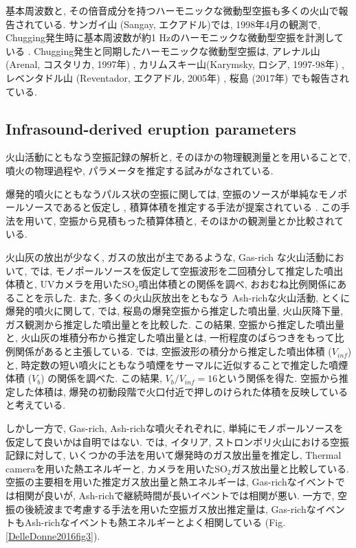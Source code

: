 \documentclass[12pt]{article}
\begin{document}
基本周波数と, その倍音成分を持つハーモニックな微動型空振も多くの火山で報告されている. サンガイ山 (Sangay, エクアドル)では, 1998年4月の観測で, Chugging発生時に基本周波数が約1 Hzのハーモニックな微動型空振を計測している \citep{Johnson2000}. Chugging発生と同期したハーモニックな微動型空振は, アレナル山 (Arenal, コスタリカ, 1997年) \citep{Hagerty2000}, カリムスキー山(Karymsky, ロシア, 1997-98年) \citep{Johnson2000}, レベンタドル山 (Reventador, エクアドル, 2005年) \citep{Lees2008}, 桜島 (2017年) \citep{sakai1996, iguchi2018} でも報告されている.


\clearpage
\subsection{Infrasound-derived eruption parameters}\label{AcointPara}

火山活動にともなう空振記録の解析と, そのほかの物理観測量とを用いることで, 噴火の物理過程や, パラメータを推定する試みがなされている. 

爆発的噴火にともなうパルス状の空振に関しては, 空振のソースが単純なモノポールソースであると仮定し \citep{Lighthill1978}, 積算体積を推定する手法が提案されている \citep{Johnson2003}. この手法を用いて, 空振から見積もった積算体積と, そのほかの観測量とか比較されている.

火山灰の放出が少なく, ガスの放出が主であるような, Gas-rich な火山活動において, \cite{Dalton2010}では, モノポールソースを仮定して空振波形を二回積分して推定した噴出体積と, UVカメラを用いたSO$_2$噴出体積との関係を調べ, おおむね比例関係にあることを示した.
また, 多くの火山灰放出をともなう Ash-richな火山活動, とくに爆発的噴火に関して, \cite{Fee2017a}では, 桜島の爆発空振から推定した噴出量, 火山灰降下量, ガス観測から推定した噴出量とを比較した. この結果, 空振から推定した噴出量と, 火山灰の堆積分布から推定した噴出量とは, 一桁程度のばらつきをもって比例関係があると主張している.
\cite{Yamada2018b}では, 空振波形の積分から推定した噴出体積 ($V_{inf}$)と, 時定数の短い噴火にともなう噴煙をサーマルに近似することで推定した噴煙体積 ($V_{b}$) の関係を調べた. この結果, $V_{b}/V_{inf}=16$という関係を得た. 空振から推定した体積は, 爆発の初動段階で火口付近で押しのけられた体積を反映していると考えている. 

しかし一方で, Gas-rich, Ash-richな噴火それぞれに, 単純にモノポールソースを仮定して良いかは自明ではない. \cite{DelleDonne2016} では, イタリア, ストロンボリ火山における空振記録に対して, いくつかの手法を用いて爆発時のガス放出量を推定し, Thermal cameraを用いた熱エネルギーと, カメラを用いたSO$_2$ガス放出量と比較している. 
空振の主要相を用いた推定ガス放出量と熱エネルギーは, Gas-richなイベントでは相関が良いが, Ash-richで継続時間が長いイベントでは相関が悪い. 一方で, 空振の後続波まで考慮する手法を用いた空振ガス放出推定量は, Gas-richなイベントもAsh-richなイベントも熱エネルギーとよく相関している (Fig. \ref{DelleDonne2016fig3}). 
\end{document}
